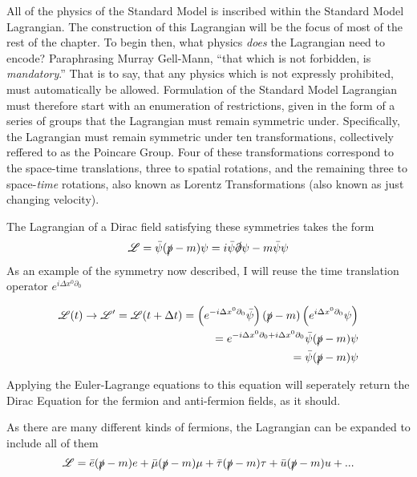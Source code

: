     All of the physics of the Standard Model is inscribed within the Standard Model Lagrangian.
    The construction of this Lagrangian will be the focus of most of the rest of the chapter.
    To begin then, what physics \textit{does} the Lagrangian need to encode?
    Paraphrasing Murray Gell-Mann, ``that which is not forbidden, is \textit{mandatory}.''
    That is to say, that any physics which is not expressly prohibited, must automatically be allowed.
    Formulation of the Standard Model Lagrangian must therefore start with an enumeration of restrictions,
        given in the form of a series of groups that the Lagrangian must remain symmetric under.
    Specifically, the Lagrangian must remain symmetric under ten transformations,
        collectively reffered to as the Poincare Group.
    Four of these transformations correspond to the space-time translations,
        three to spatial rotations, and the remaining three to space-\textit{time} rotations,
        also known as Lorentz Transformations (also known as just changing velocity).

    The Lagrangian of a Dirac field satisfying these symmetries takes the form
    \begin{equation} \label{eq:basic_fermionL}
        \mathscr{L} = \bar{\psi} (\slashed{p} - m) \psi = i \bar{\psi} \slashed{\partial} \psi - m \bar{\psi} \psi
    \end{equation}
    As an example of the symmetry now described, I will reuse the time translation operator $e^{i\Delta x^0 \partial_0}$

    \begin{equation} \begin{split}
        \mathscr{L}(t) \to \mathscr{L}' = \mathscr{L}(t+\Delta t) =
            \left( e^{-i\Delta x^0 \partial_0} \bar{\psi} \right) (\slashed{p} - m) \left( e^{i\Delta x^0 \partial_0}\psi \right)
        \\  = e^{-i\Delta x^0 \partial_0 + i \Delta x^0 \partial_0} \bar{\psi} (\slashed{p} - m) \psi
        \\  = \bar{\psi} (\slashed{p} - m) \psi
    \end{split} \end{equation}

    Applying the Euler-Lagrange equations to this equation will seperately return the Dirac Equation
        for the fermion and anti-fermion fields, as it should.

    As there are many different kinds of fermions, the Lagrangian can be expanded to include all of them
    \begin{equation}
        \mathscr{L} = \bar{e} (\slashed{p} - m) e
        + \bar{\mu} (\slashed{p} - m) \mu
        + \bar{\tau} (\slashed{p} - m) \tau
        + \bar{u} (\slashed{p} - m) u
        + ...
    \end{equation}


